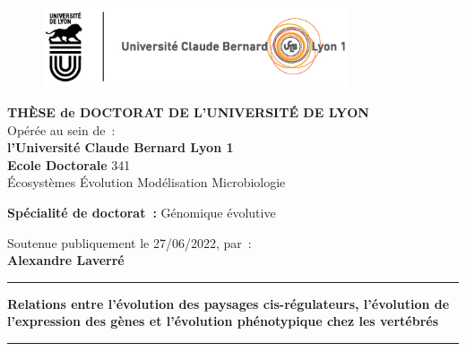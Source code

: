\thispagestyle{empty}

\unitlength 1cm
\begin{center}
    \vspace*{-2.5cm}
    \begin{figure}[h]
        \centering
        \includegraphics[width=0.8\textwidth]{figures/Logo_Lyon_UCBL.jpg}
    \end{figure}

    {\large \textbf{THÈSE de DOCTORAT DE L'UNIVERSITÉ DE LYON}\\}
    {Opérée au sein de~:\\}
    {\large \textbf{l'Université Claude Bernard Lyon 1}\\}
    \vspace{12pt}
    {\large \textbf{Ecole Doctorale} 341 \\
    \vspace{0.15cm}
    Écosystèmes Évolution Modélisation Microbiologie
    }
    
    \vspace{12pt}
    {\large \textbf{Spécialité de doctorat~:} Génomique évolutive
    \\}
    \vspace{0.8cm}

    {Soutenue publiquement le 27/06/2022, par~:\\}
    \vspace{0.15cm}
    {\Large \textbf{Alexandre Laverré}\\}
    \vspace{0.5cm}
    \rule{5cm}{1pt}
    
    \vspace{12pt}
    {\Large \textbf{Relations entre l’évolution des paysages cis-régulateurs, l’évolution de l’expression des gènes et l’évolution phénotypique chez les vertébrés}\par}
    \vspace{12pt}
    \rule{5cm}{1pt}
    \vspace{0.5cm}

\end{center}

